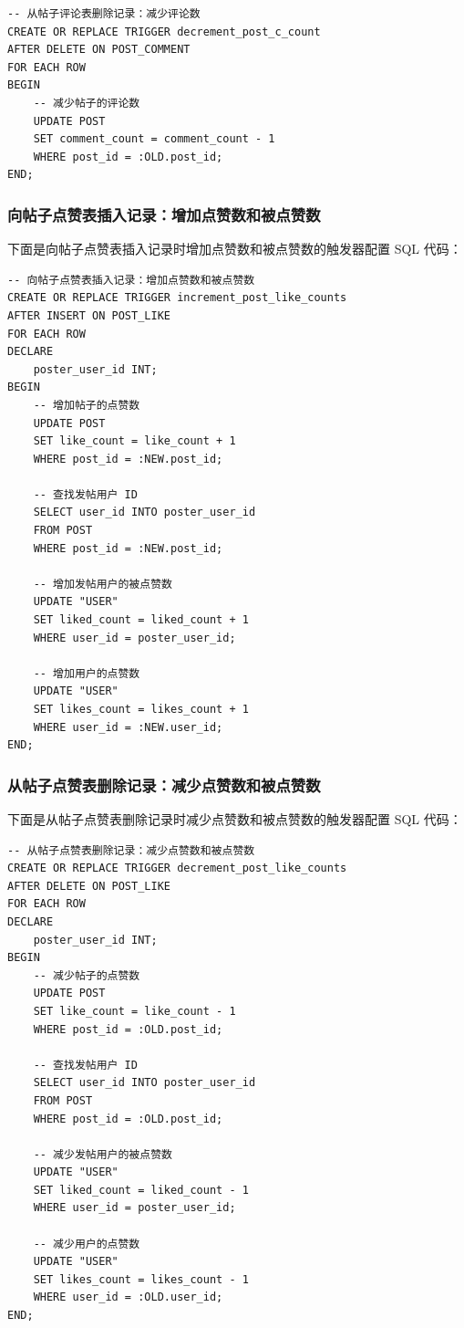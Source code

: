 \begin{verbatim}
-- 从帖子评论表删除记录：减少评论数
CREATE OR REPLACE TRIGGER decrement_post_c_count
AFTER DELETE ON POST_COMMENT
FOR EACH ROW
BEGIN
    -- 减少帖子的评论数
    UPDATE POST
    SET comment_count = comment_count - 1
    WHERE post_id = :OLD.post_id;
END;
\end{verbatim}

\subsubsection{向帖子点赞表插入记录：增加点赞数和被点赞数}

下面是向帖子点赞表插入记录时增加点赞数和被点赞数的触发器配置 SQL 代码：

\begin{verbatim}
-- 向帖子点赞表插入记录：增加点赞数和被点赞数
CREATE OR REPLACE TRIGGER increment_post_like_counts
AFTER INSERT ON POST_LIKE
FOR EACH ROW
DECLARE
    poster_user_id INT;
BEGIN
    -- 增加帖子的点赞数
    UPDATE POST
    SET like_count = like_count + 1
    WHERE post_id = :NEW.post_id;

    -- 查找发帖用户 ID
    SELECT user_id INTO poster_user_id
    FROM POST
    WHERE post_id = :NEW.post_id;

    -- 增加发帖用户的被点赞数
    UPDATE "USER"
    SET liked_count = liked_count + 1
    WHERE user_id = poster_user_id;

    -- 增加用户的点赞数
    UPDATE "USER"
    SET likes_count = likes_count + 1
    WHERE user_id = :NEW.user_id;
END;
\end{verbatim}

\subsubsection{从帖子点赞表删除记录：减少点赞数和被点赞数}

下面是从帖子点赞表删除记录时减少点赞数和被点赞数的触发器配置 SQL 代码：

\begin{verbatim}
-- 从帖子点赞表删除记录：减少点赞数和被点赞数
CREATE OR REPLACE TRIGGER decrement_post_like_counts
AFTER DELETE ON POST_LIKE
FOR EACH ROW
DECLARE
    poster_user_id INT;
BEGIN
    -- 减少帖子的点赞数
    UPDATE POST
    SET like_count = like_count - 1
    WHERE post_id = :OLD.post_id;

    -- 查找发帖用户 ID
    SELECT user_id INTO poster_user_id
    FROM POST
    WHERE post_id = :OLD.post_id;

    -- 减少发帖用户的被点赞数
    UPDATE "USER"
    SET liked_count = liked_count - 1
    WHERE user_id = poster_user_id;

    -- 减少用户的点赞数
    UPDATE "USER"
    SET likes_count = likes_count - 1
    WHERE user_id = :OLD.user_id;
END;
\end{verbatim}

